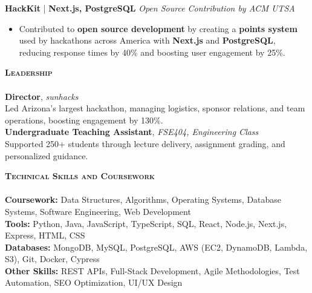 \documentclass[10pt]{article}
\newcommand{\lineunder} {
    \vspace*{-8pt} \\
    \hspace*{-18pt} \hrulefill \\
}
\newcommand{\header} [1] {
    {\hspace*{-15pt}\vspace*{3pt} \textsc{#1}}
    \vspace*{-2pt} \lineunder
}
\begin{document}
\textbf{HackKit} | \textbf{Next.js, PostgreSQL} \hfill \textit{Open Source Contribution by ACM UTSA}  
\vspace{-1mm}  
\begin{itemize}[leftmargin=5mm, itemsep=0mm]  
  \item Contributed to \textbf{open source development} by creating a \textbf{points system} used by hackathons across America with \textbf{Next.js} and \textbf{PostgreSQL}, reducing response times by 40\% and boosting user engagement by 25\%.  
\end{itemize}  


\header{\textbf{Leadership}}
\vspace{0.5mm}
\textbf{Director}, \textit{sunhacks} \\
Led Arizona’s largest hackathon, managing logistics, sponsor relations, and team operations, boosting engagement by 130\%.
\vspace{2mm}
\\
\textbf{Undergraduate Teaching Assistant}, \textit{FSE404, Engineering Class} \\
Supported 250+ students through lecture delivery, assignment grading, and personalized guidance.

\vspace{2mm}
\header{\textbf{Technical Skills and Coursework}}
\vspace{0.5mm}
\textbf{Coursework:} Data Structures, Algorithms, Operating Systems, Database Systems, Software Engineering, Web Development \\
\vspace{0.5mm}
\textbf{Tools:} Python, Java, JavaScript, TypeScript, SQL, React, Node.js, Next.js, Express, HTML, CSS \\
\vspace{0.5mm}
\textbf{Databases:} MongoDB, MySQL, PostgreSQL, AWS (EC2, DynamoDB, Lambda, S3), Git, Docker, Cypress \\
\vspace{0.5mm}
\textbf{Other Skills:} REST APIs, Full-Stack Development, Agile Methodologies, Test Automation, SEO Optimization, UI/UX Design \\
\end{document}
